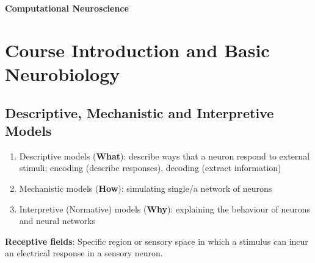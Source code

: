 \documentclass[11pt]{article}
\begin{document}
\begin{center}
    \begin{large}
        \textbf{Computational Neuroscience}
    \end{large}
\end{center}
\tableofcontents

\newpage
\section{Course Introduction and Basic Neurobiology}
\subsection{Descriptive, Mechanistic and Interpretive Models}
\begin{enumerate}
    \item Descriptive models (\textbf{What}): describe ways that a neuron respond to external stimuli; encoding (describe responses), decoding (extract information)
    \item Mechanistic models (\textbf{How}): simulating single/a network of neurons
    \item Interpretive (Normative) models (\textbf{Why}): explaining the behaviour of neurons and neural networks
\end{enumerate}
\noindent \textbf{Receptive fields}: Specific region or sensory space in which a stimulus can incur an electrical response in a sensory neuron.
\end{document}
